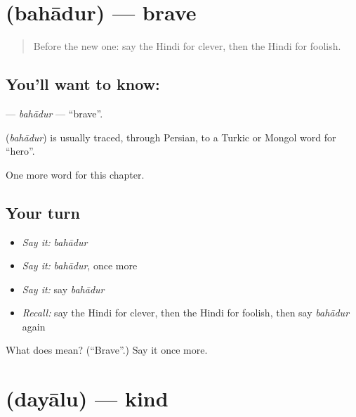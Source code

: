 \section[\texorpdfstring{\hi{बहादुर} (bahādur)}{बहादुर (bahādur)}]{ (bahādur) — brave}

\label{lesson:HI-C215-bahadur}



\begin{quote}
Before the new one: say the Hindi for clever, then the Hindi for foolish.
\end{quote}

\subsection*{You'll want to know: }
\textbf{} — \emph{bahādur} — \textquotedblleft{}brave\textquotedblright{}.

\begin{cousinweb}
\textbf{} (\emph{bahādur}) is usually traced, through Persian, to a Turkic or Mongol word for \textquotedblleft{}hero\textquotedblright{}.
\end{cousinweb}

\begin{grammarlens}[title={What you've built}]
One more word for this chapter.
\end{grammarlens}

\subsection*{Your turn}
\begin{itemize}
\raggedright
  \item \emph{Say it:} \emph{bahādur}
  \item \emph{Say it:} \emph{bahādur}, once more
  \item \emph{Say it:} say \emph{bahādur}
  \item \emph{Recall:} say the Hindi for clever, then the Hindi for foolish, then say \emph{bahādur} again
\end{itemize}

\begin{tcolorbox}[breakable,colback=teal!4,colframe=teal!35!black,title={Before you move on}]
What does  mean? (\textquotedblleft{}Brave\textquotedblright{}.) Say it once more.
\end{tcolorbox}
\section[\texorpdfstring{\hi{दयालु} (dayālu)}{दयालु (dayālu)}]{ (dayālu) — kind}

